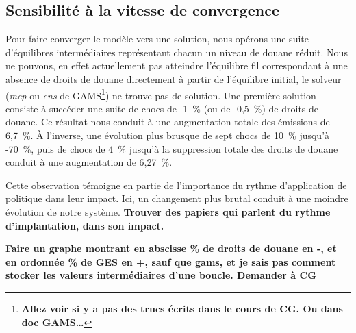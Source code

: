 \subsection{Sensibilité à la vitesse de convergence}\label{subsec:vit_cvg}

Pour faire converger le modèle vers une solution, nous opérons une suite d'équilibres intermédiaires représentant chacun un niveau de douane réduit. Nous ne pouvons, en effet actuellement pas atteindre l'équilibre fil correspondant à une absence de droits de douane directement à partir de l'équilibre initial, le solveur (\textit{mcp} ou \textit{cns} de GAMS\footnote{\textbf{Allez voir si y a pas des trucs écrits dans le cours de CG. Ou dans doc GAMS\dots}}) ne trouve pas de solution. Une première solution consiste à succéder une suite de chocs de -1~\% (ou de -0,5~\%) de droits de douane. Ce résultat nous conduit à une augmentation totale des émissions de 6,7~\%. À l'inverse, une évolution plus brusque de sept chocs de 10~\% jusqu'à -70~\%, puis de chocs de 4~\% jusqu'à la suppression totale des droits de douane conduit à une augmentation de 6,27~\%.

Cette observation témoigne en partie de l'importance du rythme d'application de politique dans leur impact. Ici, un changement plus brutal conduit à une moindre évolution de notre système. \textbf{Trouver des papiers qui parlent du rythme d'implantation, dans son impact.}

\textbf{Faire un graphe montrant en abscisse \% de droits de douane en -, et en ordonnée \% de GES en +, sauf que gams, et je sais pas comment stocker les valeurs intermédiaires d'une boucle. Demander à CG}
